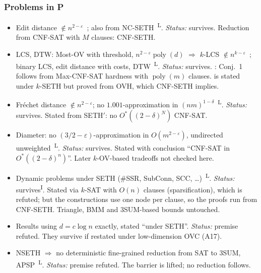 \documentclass[10pt]{amsart}
\theoremstyle{plain}
\theoremstyle{definition}
\theoremstyle{remark}
\numberwithin{equation}{section}
\newcommand{\poly}{\operatorname{poly}}
\newcommand{\Lit}{\textsuperscript{L}}
\newcommand{\Inf}{\textsuperscript{I}}
\begin{document}
{\subsubsection*{Problems in P}
\begin{itemize}[leftmargin=2.6em,itemsep=2pt]
\item[B5] Edit distance $\notin n^{2-\varepsilon}$~\cite{BI18}; also from NC-SETH~\cite{AHVWW16}\Lit. \emph{Status:} survives. Reduction from CNF-SAT with $M$ clauses: CNF-SETH.
\item[B6] LCS, DTW: Most-OV with threshold, $n^{2-\varepsilon}\poly(d)$ $\Rightarrow$ $k$-LCS $\notin n^{k-\varepsilon}$~\cite[Thm.~1, Conj.~1]{ABV15}; binary LCS, edit distance with costs, DTW~\cite{BK15}\Lit. \emph{Status:} survives. \cite[Lemma~1]{ABV15}: Conj.~1 follows from Max-CNF-SAT hardness with $\poly(m)$ clauses. \cite{BK15} is stated under $k$-SETH but proved from OVH, which CNF-SETH implies.
\item[B7] Fr\'echet distance $\notin n^{2-\varepsilon}$; no $1.001$-approximation in $(nm)^{1-\delta}$~\cite{Bri14}\Lit. \emph{Status:} survives. Stated from SETH$'$: no $O^*((2-\delta)^N)$ CNF-SAT.
\item[B8] Diameter: no $(3/2-\varepsilon)$-approximation in $O(m^{2-\varepsilon})$, undirected unweighted~\cite[Thm.~1]{RVW13}\Lit. \emph{Status:} survives. Stated with conclusion ``CNF-SAT in $O^*((2-\delta)^n)$''. Later $k$-OV-based tradeoffs not checked here.
\item[B9] Dynamic problems under SETH (\#SSR, SubConn, SCC, \dots)~\cite{AVW14}\Lit. \emph{Status:} survives\Inf. Stated via $k$-SAT with $O(n)$ clauses (sparsification), which is refuted; but the constructions use one node per clause, so the proofs run from CNF-SETH. Triangle, BMM and 3SUM-based bounds untouched.
\item[B10] Results using $d=c\log n$ exactly, stated ``under SETH''. \emph{Status:} premise refuted. They survive if restated under low-dimension OVC (A17).
\item[B26] NSETH $\Rightarrow$ no deterministic fine-grained reduction from SAT to 3SUM, APSP~\cite{CGIMPS16}\Lit. \emph{Status:} premise refuted. The barrier is lifted; no reduction follows.
\end{itemize}
}
\end{document}

